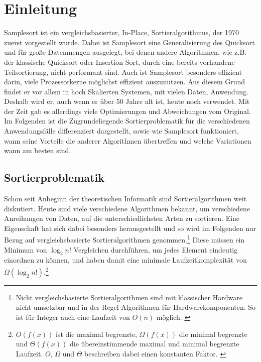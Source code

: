 \section{Einleitung}
	Samplesort ist ein vergleichsbasierter, In-Place, Sortieralgorithmus, der 1970 zuerst vorgestellt wurde. \autocite{frazer-1970}
	Dabei ist Samplesort eine Generalisierung des Quicksort und für große Datenmengen ausgelegt, bei denen andere Algorithmen, wie z.B. der klassische Quicksort oder Insertion Sort, durch eine bereits vorhandene Teilsortierung, nicht performant sind.
	Auch ist Samplesort besonders effizient darin, viele Prozessorkerne möglichst effizient auszunutzen.
	Aus diesem Grund findet er vor allem in hoch Skalierten Systemen, mit vielen Daten, Anwendung.\\
	Deshalb wird er, auch wenn er über 50 Jahre alt ist, heute noch verwendet.
	Mit der Zeit gab es allerdings viele Optimierungen und Abweichungen vom Original.
	Im Folgenden ist die Zugrundeliegende Sortierproblematik für die verschiedenen Anwendungsfälle differenziert dargestellt, sowie wie Samplesort funktioniert, wann seine Vorteile die anderer Algorithmen übertreffen und welche Variationen wann am besten sind.
	
	\subsection{Sortierproblematik}
		Schon seit Anbeginn der theoretischen Informatik sind Sortieralgorithmen weit diskutiert.
		Heute sind viele verschiedene Algorithmen bekannt, um verschiedene Anreihungen von Daten, auf die unterschiedlichsten Arten zu sortieren.
		Eine Eigenschaft hat sich dabei besonders herausgestellt und so wird im Folgenden nur Bezug auf vergleichsbasierte Sortieralgorithmen genommen.\footnote{Nicht vergleichsbasierte Sortieralgorithmen sind mit klassischer Hardware nicht umsetzbar und in der Regel Algorithmen für Hardwarekomponenten. So ist für Integer auch eine Laufzeit von $O(n)$ möglich. \autocite{abdel-hafeez-2017}}
		Diese müssen ein Minimum von $\log_2{n!}$ Vergleichen durchführen, um jedes Element eindeutig einordnen zu können, und haben damit eine minimale Laufzeitkomplexität von $\Omega(\log_2{n!})$.\footnote{$O(f(x))$ ist die maximal begrenzte, $\Omega(f(x))$ die minimal begrenzte und $\Theta(f(x))$ die übereinstimmende maximal und minimal begrenzte Laufzeit. $O$, $\Omega$ und $\Theta$ beschreiben dabei einen konstanten Faktor. \autocite[4]{sedgewick-1996}}
	
